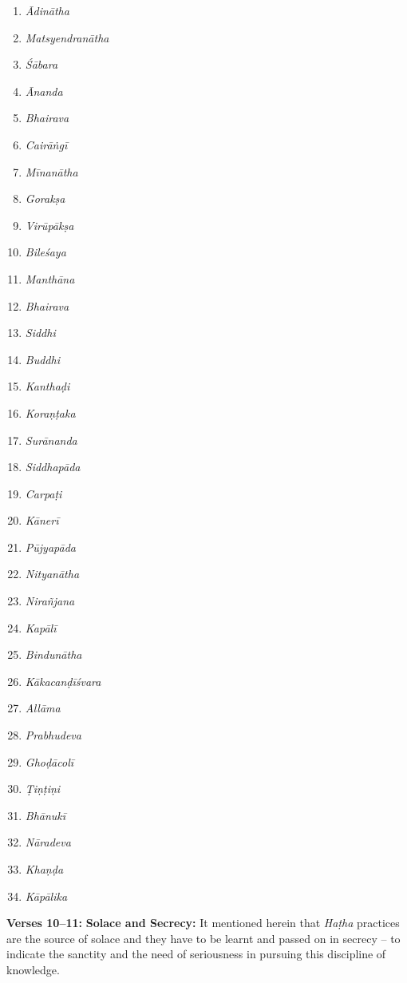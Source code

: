 \begin{multicols}{3}
\begin{enumerate}
\itemsep=0pt
\item \textit{Ādinātha}
\item \textit{Matsyendranātha}
\item \textit{Śābara}
\item \textit{Ānanda}
\item \textit{Bhairava }
\item \textit{Cairāṅgī }
\item \textit{Mīnanātha}
\item \textit{Gorakṣa }
\item \textit{Virūpākṣa }
\item \textit{Bileśaya }
\item \textit{Manthāna}
\item \textit{Bhairava }
\item \textit{Siddhi}
\item \textit{Buddhi}
\item \textit{Kanthaḍi }
\item \textit{Koraṇṭaka }
\item \textit{Surānanda}
\item \textit{Siddhapāda }
\item \textit{Carpaṭi}
\item \textit{Kānerī}
\item \textit{Pūjyapāda}
\item \textit{Nityanātha}
\item \textit{Nirañjana}
\item \textit{Kapālī }
\item \textit{Bindunātha}
\item \textit{Kākacanḍīśvara}
\item \textit{Allāma}
\item \textit{Prabhudeva}
\item \textit{Ghoḍācolī}
\item \textit{Ṭiṇṭiṇi}
\item \textit{Bhānukī}
\item \textit{Nāradeva}
\item \textit{Khaṇḍa}
\item \textit{Kāpālika}
\end{enumerate}
\end{multicols}


\textbf{Verses 10--11:} \textbf{Solace and Secrecy:} It mentioned herein that \textit{Haṭha} practices are the source of solace and they have to be learnt and passed on in secrecy – to indicate the sanctity and the need of seriousness in pursuing this discipline of knowledge.

